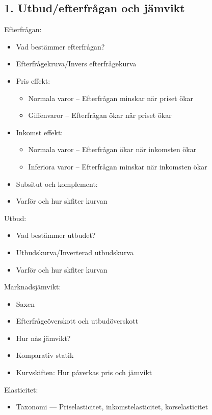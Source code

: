 \documentclass[12pt,a4paper]{article}
\begin{document}
{\subsection*{1. Utbud/efterfrågan och jämvikt}
Efterfrågan:
\begin{itemize}
    \item Vad bestämmer efterfrågan?
    \item Efterfrågekruva/Invers efterfrågekurva
    \item Pris effekt:
    \begin{itemize}
        \item Normala varor -- Efterfrågan minskar när priset ökar
        \item Giffenvaror -- Efterfrågan ökar när priset ökar
    \end{itemize}
    \item Inkomst effekt:
    \begin{itemize}
        \item Normala varor -- Efterfrågan ökar när inkomsten ökar
        \item Inferiora varor -- Efterfrågan minskar när inkomsten ökar
    \end{itemize}
    \item Subsitut och komplement:
    \item Varför och hur skfiter kurvan 
\end{itemize}

Utbud:
\begin{itemize}
    \item Vad bestämmer utbudet?
    \item Utbudskurva/Inverterad utbudskurva
    \item Varför och hur skfiter kurvan
\end{itemize}

Marknadsjämvikt:
\begin{itemize}
    \item Saxen
    \item Efterfrågeöverskott och utbudöverskott
    \item Hur nås jämvikt?
    \item Komparativ statik
    \item Kurvskiften: Hur påverkas pris och jämvikt
\end{itemize}

Elasticitet:
\begin{itemize}
    \item Taxonomi --- Priselasticitet, inkomstelasticitet, korselasticitet
\end{itemize}

}
\end{document}
